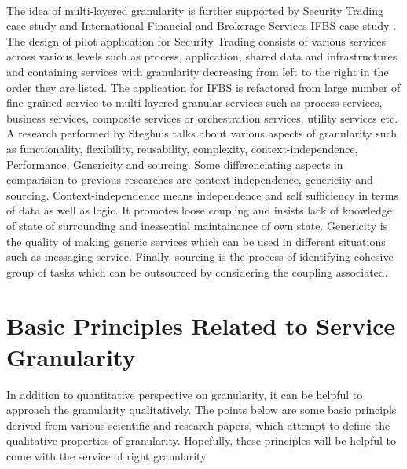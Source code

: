 \\
The idea of multi-layered granularity is further supported by Security Trading case study \cite{Abdelkarim-Erradi:2006aa} and International Financial and Brokerage Services \acrshort{IFBS} case study \cite{Naveen-Kulkarni:2008aa}. The design of pilot application for Security Trading consists of various services across various levels such as process, application, shared data and infrastructures and containing services with granularity decreasing from left to the right in the order they are listed. The application for IFBS is refactored from large number of fine-grained service to multi-layered granular services such as process services, business services, composite services or orchestration services, utility services etc.
\\
A research performed by Steghuis \cite{Steghuis:2006aa} talks about various aspects of granularity such as functionality, flexibility, reusability, complexity, context-independence, Performance, Genericity and sourcing. Some differenciating aspects in comparision to previous researches are context-independence, genericity and sourcing. Context-independence means independence and self sufficiency in terms of data as well as logic. It promotes loose coupling and insists lack of knowledge of state of surrounding and inessential maintainance of own state. Genericity is the quality of making generic services which can be used in different situations such as messaging service. Finally, sourcing is the process of identifying cohesive group of tasks which can be outsourced by considering the coupling associated.


\section{Basic Principles Related to Service Granularity}\label{section:granularity/principles}
In addition to quantitative perspective on granularity, it can be helpful to approach the granularity qualitatively. The points below are some basic principls derived from various scientific and research papers, which attempt to define the qualitative properties of granularity. Hopefully, these principles will be helpful to come with the service of right granularity.

